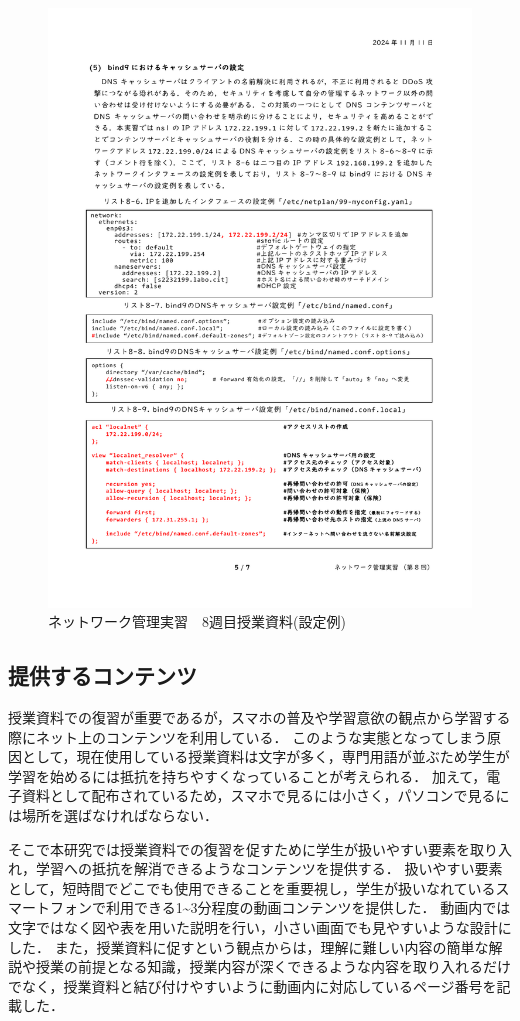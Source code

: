 \documentclass[12pt,a4j,titlepage]{ltjsarticle}
\begin{document}
\begin{figure}[!htb]
  \centering
  \includegraphics[width=12cm]{8週目2.pdf}
  \caption{ネットワーク管理実習　8週目授業資料(設定例)}
  \label{fig:8no2}
\end{figure}

\clearpage

\subsection{提供するコンテンツ}
授業資料での復習が重要であるが，スマホの普及や学習意欲の観点から学習する際にネット上のコンテンツを利用している．
このような実態となってしまう原因として，現在使用している授業資料は文字が多く，専門用語が並ぶため学生が学習を始めるには抵抗を持ちやすくなっていることが考えられる．
加えて，電子資料として配布されているため，スマホで見るには小さく，パソコンで見るには場所を選ばなければならない．

そこで本研究では授業資料での復習を促すために学生が扱いやすい要素を取り入れ，学習への抵抗を解消できるようなコンテンツを提供する．
扱いやすい要素として，短時間でどこでも使用できることを重要視し，学生が扱いなれているスマートフォンで利用できる1\textasciitilde3分程度の動画コンテンツを提供した．
動画内では文字ではなく図や表を用いた説明を行い，小さい画面でも見やすいような設計にした．
また，授業資料に促すという観点からは，理解に難しい内容の簡単な解説や授業の前提となる知識，授業内容が深くできるような内容を取り入れるだけでなく，授業資料と結び付けやすいように動画内に対応しているページ番号を記載した．
\end{document}
